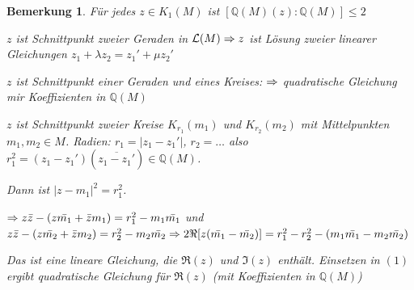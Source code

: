 \documentclass[a4paper,10pt,german]{scrbook}
\theoremstyle{saetze}
\theoremstyle{definitionen}
\newtheorem{Bem}[Def]{Bemerkung}
\begin{document}
\begin{Bem}
Für jedes $z \in K_1(M)$ ist
$[\mathbb{Q}(M)(z) : \mathbb{Q}(M)] \leq 2$

 {
\item $z$ ist Schnittpunkt zweier Geraden in $\mathcal{L}(M) \Rightarrow
z$ ist Lösung zweier linearer Gleichungen $z_1 + \lambda z_2 = z_1'
+ \mu z_2'$
\item $z$ ist Schnittpunkt einer Geraden und eines Kreises: $\Rightarrow$
quadratische Gleichung mir Koeffizienten in $\mathbb{Q}(M)$
\item $z$ ist Schnittpunkt zweier Kreise $K_{r_1}(m_1)$ und
$K_{r_2}(m_2)$ mit Mittelpunkten $m_1,m_2 \in M$. Radien: $r_1 =
|z_1 - z_1'|$, $r_2 = \dots$ also $r_1^2 = (z_1 - z_1') (\overline{z_1 -
z_1'}) \in \mathbb{Q}(M)$.

Dann ist $|z-m_1|^2 = r_1^2$.

$\Rightarrow z\bar z - (z\bar{m_1} + \bar z m_1) = r_1^2 - m_1 \bar{m_1}$
und $z \bar z - (z \bar{m_2} + \bar z m_2) = r_2^2 - m_2 \bar{m_2}
\Rightarrow 2 \Re[z(\bar{m_1} - \bar{m_2})] = r_1^2 - r_2^2 - (m_1 \bar{m_1}
- m_2 \bar{m_2})$

Das ist eine lineare Gleichung, die $\Re(z)$ und $\Im(z)$ enthält.
Einsetzen in $(1)$ ergibt quadratische Gleichung für $\Re(z)$ (mit
Koeffizienten in $\mathbb{Q}(M)$)}
\end{Bem}
\end{document}
